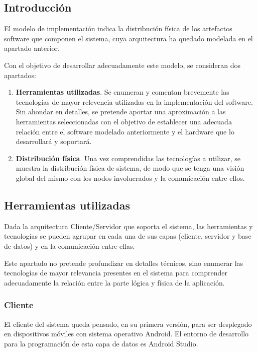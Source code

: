\subsection{Introducción}

El modelo de implementación indica la distribución física de los artefactos software que componen el sistema, cuya arquitectura ha quedado modelada en el apartado anterior.

Con el objetivo de desarrollar adecuadamente este modelo, se consideran dos apartados:

\begin{enumerate}
	\item{\textbf{Herramientas utilizadas}. Se enumeran y comentan brevemente las tecnologías de mayor relevencia utilizadas en la implementación del software. Sin ahondar en detalles, se pretende aportar una aproximación a las herramientas seleccionadas con el objetivo de establecer una adecuada relación entre el software modelado anteriormente y el hardware que lo desarrollará y soportará}.
	\item{\textbf{Distribución física}. Una vez comprendidas las tecnologías a utilizar, se muestra la distribución física de sistema, de modo que se tenga una visión global del mismo con los nodos involucrados y la comunicación entre ellos}.
\end{enumerate}

\subsection{Herramientas utilizadas}

Dada la arquitectura Cliente/Servidor que soporta el sistema, las herramientas y tecnologías se pueden agrupar en cada una de sus capas (cliente, servidor y base de datos) y en la comunicación entre ellas. 

Este apartado no pretende profundizar en detalles técnicos, sino enumerar las tecnologías de mayor relevancia presentes en el sistema para comprender adecuadamente la relación entre la parte lógica y física de la aplicación.

\subsubsection{Cliente}

El cliente del sistema queda pensado, en su primera versión, para ser desplegado en dispositivos móviles con sistema operativo Android. El entorno de desarrollo para la programación de esta capa de datos es Android Studio.

